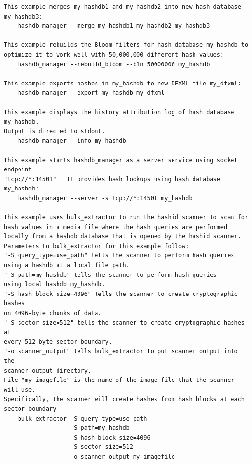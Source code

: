 \documentclass[11pt,twoside]{article}
\begin{document}
\begin{small}
\begin{verbatim}
This example merges my_hashdb1 and my_hashdb2 into new hash database
my_hashdb3:
    hashdb_manager --merge my_hashdb1 my_hashdb2 my_hashdb3

This example rebuilds the Bloom filters for hash database my_hashdb to
optimize it to work well with 50,000,000 different hash values:
    hashdb_manager --rebuild_bloom --b1n 50000000 my_hashdb

This example exports hashes in my_hashdb to new DFXML file my_dfxml:
    hashdb_manager --export my_hashdb my_dfxml

This example displays the history attribution log of hash database my_hashdb.
Output is directed to stdout.
    hashdb_manager --info my_hashdb

This example starts hashdb_manager as a server service using socket endpoint
"tcp://*:14501".  It provides hash lookups using hash database my_hashdb:
    hashdb_manager --server -s tcp://*:14501 my_hashdb

This example uses bulk_extractor to run the hashid scanner to scan for
hash values in a media file where the hash queries are performed
locally from a hashdb database that is opened by the hashid scanner.
Parameters to bulk_extractor for this example follow:
"-S query_type=use_path" tells the scanner to perform hash queries
using a hashdb at a local file path.
"-S path=my_hashdb" tells the scanner to perform hash queries
using local hashdb my_hashdb.
"-S hash_block_size=4096" tells the scanner to create cryptographic hashes
on 4096-byte chunks of data.
"-S sector_size=512" tells the scanner to create cryptographic hashes at
every 512-byte sector boundary.
"-o scanner_output" tells bulk_extractor to put scanner output into the
scanner_output directory.
File "my_imagefile" is the name of the image file that the scanner will use.
Specifically, the scanner will create hashes from hash blocks at each
sector boundary.
    bulk_extractor -S query_type=use_path
                   -S path=my_hashdb
                   -S hash_block_size=4096
                   -S sector_size=512
                   -o scanner_output my_imagefile


\end{verbatim}
\end{small}
\end{document}
